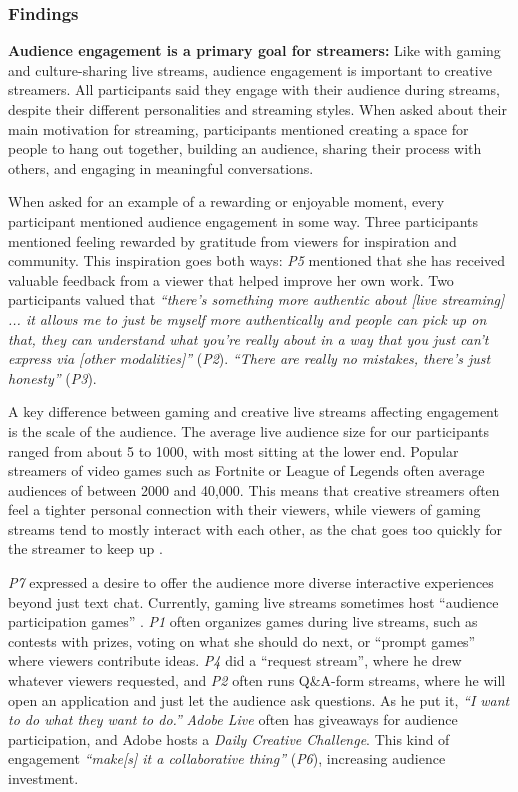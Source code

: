 \subsubsection{Findings}
\textbf{Audience engagement is a primary goal for streamers:}
Like with gaming \cite{Pellicone2017, Hamilton2014} and culture-sharing \cite{Lu2019} live streams, audience engagement is important to creative streamers. All participants said they engage with their audience during streams, despite their different personalities and streaming styles. When asked about their main motivation for streaming, participants mentioned creating a space for people to hang out together, building an audience, sharing their process with others, and engaging in meaningful conversations.

When asked for an example of a rewarding or enjoyable moment, every participant mentioned audience engagement in some way. Three participants mentioned feeling rewarded by gratitude from viewers for inspiration and community. This inspiration goes both ways: \textit{P5} mentioned that she has received valuable feedback from a viewer that helped improve her own work. Two participants valued that \textit{``there's something more authentic about [live streaming] ... it allows me to just be myself more authentically and people can pick up on that, they can understand what you're really about in a way that you just can't express via [other modalities]''} (\textit{P2}). \textit{``There are really no mistakes, there's just honesty''} (\textit{P3}).

A key difference between gaming and creative live streams affecting engagement is the scale of the audience. The average live audience size for our participants ranged from about 5 to 1000, with most sitting at the lower end. Popular streamers of video games such as Fortnite or League of Legends often average audiences of between 2000 and 40,000. This means that creative streamers often feel a tighter personal connection with their viewers, while viewers of gaming streams tend to mostly interact with each other, as the chat goes too quickly for the streamer to keep up \cite{Lessel2017, Hu2017}.

\textit{P7} expressed a desire to offer the audience more diverse interactive experiences beyond just text chat. Currently, gaming live streams sometimes host ``audience participation games'' \cite{Glickman2018}. \textit{P1} often organizes games during live streams, such as contests with prizes, voting on what she should do next, or ``prompt games'' where viewers contribute ideas. \textit{P4} did a ``request stream'', where he drew whatever viewers requested, and \textit{P2} often runs Q\&A-form streams, where he will open an application and just let the audience ask questions. As he put it, \textit{``I want to do what they want to do.''} \textit{Adobe Live} often has giveaways for audience participation, and Adobe hosts a \textit{Daily Creative Challenge}. This kind of engagement \textit{``make[s] it a collaborative thing''} (\textit{P6}), increasing audience investment.

